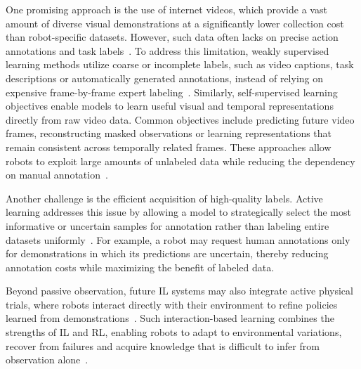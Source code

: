 One promising approach is the use of internet videos, which provide a vast amount of diverse visual demonstrations at a significantly lower collection cost than robot-specific datasets. However, such data often lacks on precise action annotations and task labels~\cite{Eze2024LearningBW, McCarthy_2025}.
To address this limitation, weakly supervised learning methods utilize coarse or incomplete labels, such as video captions, task descriptions or automatically generated annotations, instead of relying on expensive frame-by-frame expert labeling~\cite{Eze2024LearningBW}. Similarly, self-supervised learning objectives enable models to learn useful visual and temporal representations directly from raw video data. Common objectives include predicting future video frames, reconstructing masked observations or learning representations that remain consistent across temporally related frames. These approaches allow robots to exploit large amounts of unlabeled data while reducing the dependency on manual annotation~\cite{Eze2024LearningBW, McCarthy_2025}.

Another challenge is the efficient acquisition of high-quality labels. Active learning addresses this issue by allowing a model to strategically select the most informative or uncertain samples for annotation rather than labeling entire datasets uniformly~\cite{Dima2004EnablingLF, Settles2009ActiveLL}. For example, a robot may request human annotations only for demonstrations in which its predictions are uncertain, thereby reducing annotation costs while maximizing the benefit of labeled data.

Beyond passive observation, future \ac{IL} systems may also integrate active physical trials, where robots interact directly with their environment to refine policies learned from demonstrations~\cite{Ramachandruni2020AttentiveTS, Pathak2018ZeroShotVI}. Such interaction-based learning combines the strengths of \ac{IL} and \ac{RL}, enabling robots to adapt to environmental variations, recover from failures and acquire knowledge that is difficult to infer from observation alone~\cite{Eze2024LearningBW}.




